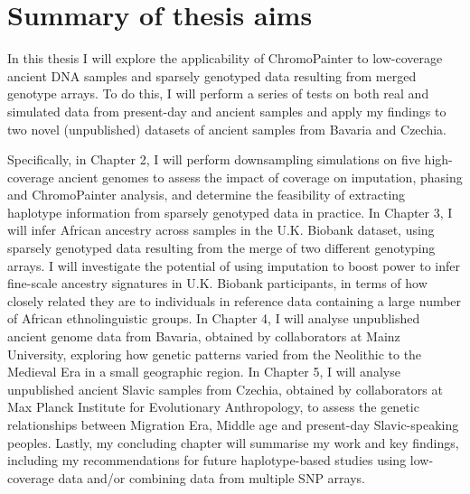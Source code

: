 \section{Summary of thesis aims}

In this thesis I will explore the applicability of ChromoPainter to low-coverage ancient DNA samples and sparsely genotyped data resulting from merged genotype arrays. To do this, I will perform a series of tests on both real and simulated data from present-day and ancient samples and apply my findings to two novel (unpublished) datasets of ancient samples from Bavaria and Czechia. 

Specifically, in Chapter 2, I will perform downsampling simulations on five high-coverage ancient genomes to assess the impact of coverage on imputation, phasing and ChromoPainter analysis, and determine the feasibility of extracting haplotype information from sparsely genotyped data in practice. In Chapter 3, I will infer African ancestry across samples in the U.K. Biobank dataset, using sparsely genotyped data resulting from the merge of two different genotyping arrays. I will investigate the potential of using imputation to boost power to infer fine-scale ancestry signatures in U.K. Biobank participants, in terms of how closely related they are to individuals in reference data containing a large number of African ethnolinguistic groups. In Chapter 4, I will analyse unpublished ancient genome data from Bavaria, obtained by collaborators at Mainz University, exploring how genetic patterns varied from the Neolithic to the Medieval Era in a small geographic region. In Chapter 5, I will analyse unpublished ancient Slavic samples from Czechia, obtained by collaborators at Max Planck Institute for Evolutionary Anthropology, to assess the genetic relationships between Migration Era, Middle age and present-day Slavic-speaking peoples. Lastly, my concluding chapter will summarise my work and key findings, including my recommendations for future haplotype-based studies using low-coverage data and/or combining data from multiple SNP arrays.




